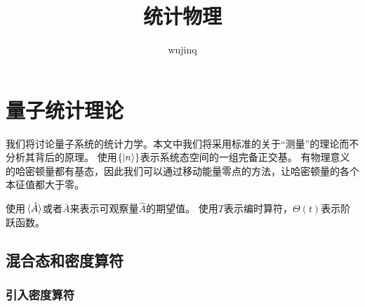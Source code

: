 \documentclass[hyperref, UTF8, a4paper]{ctexart}
\title{统计物理}
\author{wujinq}
\begin{document}
\maketitle

\section{量子统计理论}

我们将讨论量子系统的统计力学。本文中我们将采用标准的关于“测量”的理论而不分析其背后的原理。
使用$\{\ket{n}\}$表示系统态空间的一组完备正交基。
有物理意义的哈密顿量都有基态，因此我们可以通过移动能量零点的方法，让哈密顿量的各个本征值都大于零。

使用$\expval*{\hat{A}}$或者$\bar{A}$来表示可观察量$\hat{A}$的期望值。
使用$T$表示编时算符，$\Theta(t)$表示阶跃函数。

\subsection{混合态和密度算符}

\subsubsection{引入密度算符}\label{sec:introduction-of-density-operator}
\end{document}
